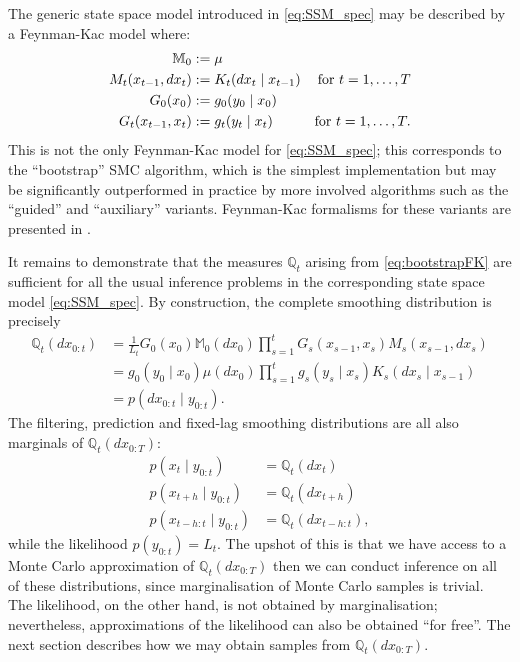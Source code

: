 The generic state space model introduced in \eqref{eq:SSM_spec} may be described by a Feynman-Kac model where:
\begin{align}
\mathbb{M}_0 &:= \mu \notag\\
M_t (x_{t-1}, dx_t) &:= K_t (dx_t \mid x_{t-1}) & \text{for } t=1,\dots,T \notag\\
G_0 (x_0) &:= g_0 ( y_0 \mid x_0 ) \notag\\
G_t (x_{t-1}, x_t) &:= g_t( y_t \mid x_t ) & \text{for } t=1,\dots,T . \label{eq:bootstrapFK}
\end{align}
This is not the only Feynman-Kac model for \eqref{eq:SSM_spec}; this corresponds to the ``bootstrap'' SMC algorithm, which is the simplest implementation but may be significantly outperformed in practice by more involved algorithms such as the ``guided''\seb{[citation]} and ``auxiliary'' \parencite{pitt1999, carpenter1999} variants. Feynman-Kac formalisms for these variants are presented in \textcite[Section 5.1.2]{chopin2020}.

It remains to demonstrate that the measures $\mathbb{Q}_t$ arising from \eqref{eq:bootstrapFK} are sufficient for all the usual inference problems in the corresponding state space model \eqref{eq:SSM_spec}.
By construction, the complete smoothing distribution is precisely
\begin{align*}
\mathbb{Q}_t (dx_{0:t})
&= \frac{1}{L_t} G_0(x_0) \mathbb{M}_0(dx_0)
        \prod_{s=1}^t G_s(x_{s-1}, x_s) M_s(x_{s-1}, dx_s) \\
&= g_0(y_0 \mid x_0) \mu(dx_0) 
        \prod_{s=1}^t g_s(y_s \mid x_s) K_s(dx_s \mid x_{s-1}) \\
&= p(dx_{0:t} \mid y_{0:t}) .
\end{align*}
The filtering, prediction and fixed-lag smoothing distributions are all also marginals of $\mathbb{Q}_t(dx_{0:T})$:
\begin{align*}
p(x_t \mid y_{0:t}) &= \mathbb{Q}_t (dx_t) \\
p(x_{t+h} \mid y_{0:t}) &= \mathbb{Q}_t (dx_{t+h}) \\
p(x_{t-h:t} \mid y_{0:t}) &= \mathbb{Q}_t (dx_{t-h:t}) ,
\end{align*}
while the likelihood $p(y_{0:t}) = L_t$.
The upshot of this is that we have access to a Monte Carlo approximation of $\mathbb{Q}_t(dx_{0:T})$ then we can conduct inference on all of these distributions, since marginalisation of Monte Carlo samples is trivial. The likelihood, on the other hand, is not obtained by marginalisation; nevertheless, approximations of the likelihood can also be obtained ``for free''. 
The next section describes how we may obtain samples from $\mathbb{Q}_t(dx_{0:T})$.




